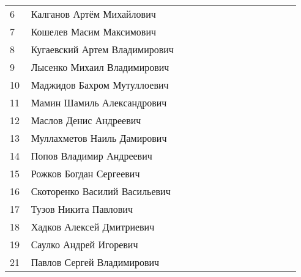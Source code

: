 \documentclass[a4paper,landscape,11pt]{article}
\newcommand*\ok{&{\small \ding{51}}} %
\newcommand*\no{&{\small }} %
\begin{document}
\begin{tabular}{p{7pt}|l|p{6pt}p{6pt}p{6pt}p{6pt}p{6pt}p{6pt}p{6pt}p{6pt}p{6pt}p{6pt}p{6pt}p{6pt}}
 6\,&Калганов Артём Михайлович         \ok\no\ok\ok\ok\no\ok\ok\ok\ok\ok\ok\\
 7\,&Кошелев Масим Максимович          \no\no\no\no\no\no\no\no\no\ok\no\no\\
 8\,&Кугаевский Артем Владимирович     \ok\no\no\ok\ok\no\no\ok\ok\ok\no\ok\\
 9\,&Лысенко Михаил Владимирович       \ok\ok\ok\ok\ok\ok\ok\ok\ok\ok\ok\ok\\
10\,&Маджидов Бахром Мутуллоевич       \no\no\no\no\no\no\no\no\\
11\,&Мамин Шамиль Александрович        \ok\no\no\ok\ok\no\ok\ok\ok\ok\ok\ok\\
\midrule
12\,&Маслов Денис Андреевич            \ok\ok\ok\ok\ok\no\no\ok\ok\ok\ok\ok\\
13\,&Муллахметов Наиль Дамирович       \ok\ok\no\ok\no\no\ok\no\ok\ok\no\no\\
14\,&Попов Владимир Андреевич          \ok\ok\no\ok\ok\ok\ok\ok\ok\ok\no\no\\
15\,&Рожков Богдан Сергеевич           \no\no\no\no\no\no\no\no\\
16\,&Скоторенко Василий Васильевич     \ok\ok\ok\ok\ok\ok\ok\ok\ok\ok\ok\ok\\
17\,&Тузов Никита Павлович             \ok\ok\ok\ok\ok\ok\ok\ok\ok\ok\ok\ok\\
18\,&Хадков Алексей Дмитриевич         \ok\no\ok\ok\ok\ok\ok\ok\ok\ok\ok\ok\\
19\,&Саулко Андрей Игоревич            \ok\no\no\ok\ok\no\no\ok\ok\ok\ok\ok\\
21\,&Павлов Сергей Владимирович        \ok\ok\no\ok\no\no\no\ok\no\no\ok\no\\   
\bottomrule
\end{tabular} 
\newpage
%
\hspace{-3cm}
\end{document}
